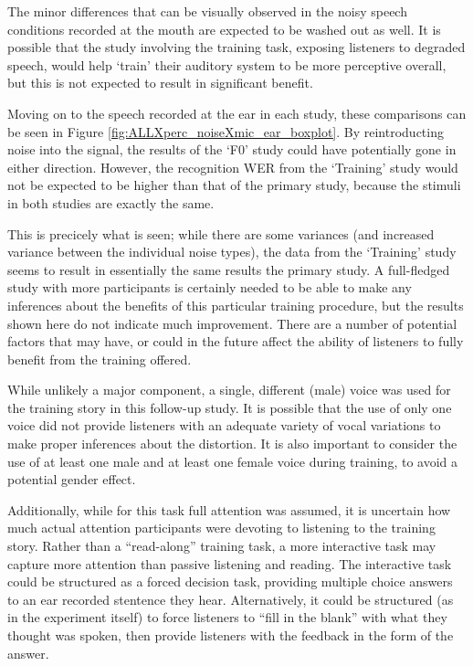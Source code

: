 \documentclass[dissertation,copyright]{uathesis}
\begin{document}
The minor differences that can be visually observed in the noisy speech conditions recorded at the mouth are expected to be washed out as well.  It is possible that the study involving the training task, exposing listeners to degraded speech, would help `train' their auditory system to be more perceptive overall, but this is not expected to result in significant benefit.

Moving on to the speech recorded at the ear in each study, these comparisons can be seen in Figure \ref{fig:ALLXperc_noiseXmic_ear_boxplot}.  By reintroducting noise into the signal, the results of the `F0' study could have potentially gone in either direction.  However, the recognition WER from the `Training' study would not be expected to be higher than that of the primary study, because the stimuli in both studies are exactly the same.  

This is precicely what is seen; while there are some variances (and increased variance between the individual noise types), the data from the `Training' study seems to result in essentially the same results the primary study.  A full-fledged study with more participants is certainly needed to be able to make any inferences about the benefits of this particular training procedure, but the results shown here do not indicate much improvement.  There are a number of potential factors that may have, or could in the future affect the ability of listeners to fully benefit from the training offered.  

While unlikely a major component, a single, different (male) voice was used for the training story in this follow-up study.  It is possible that the use of only one voice did not provide listeners with an adequate variety of vocal variations to make proper inferences about the distortion.  It is also important to consider the use of at least one male and at least one female voice during training, to avoid a potential gender effect.

Additionally, while for this task full attention was assumed, it is uncertain how much actual attention participants were devoting to listening to the training story.  Rather than a ``read-along'' training task, a more interactive task may capture more attention than passive listening and reading.  The interactive task could be structured as a forced decision task, providing multiple choice answers to an ear recorded stentence they hear.  Alternatively, it could be structured (as in the experiment itself) to force listeners to ``fill in the blank'' with what they thought was spoken, then provide listeners with the feedback in the form of the answer.  
\end{document}

